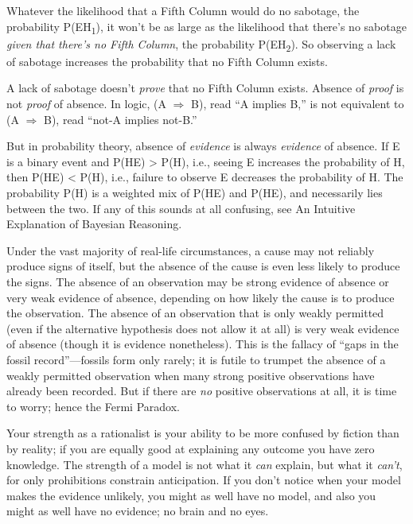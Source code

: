 {
 Whatever the likelihood that a Fifth Column would do no sabotage,
the probability P({\textlnot}E{\textbar}H\textsubscript{1}), it
won't be as large as the likelihood that
there's no sabotage \textit{given that
there's no Fifth Column}, the probability
P({\textlnot}E{\textbar}H\textsubscript{2}). So observing a lack of
sabotage increases the probability that no Fifth Column exists.}

{
 A lack of sabotage doesn't \textit{prove} that no
Fifth Column exists. Absence of \textit{proof} is not \textit{proof} of
absence. In logic, (A $\Rightarrow $ B), read ``A
implies B,'' is not equivalent to ({\textlnot}A
$\Rightarrow $ {\textlnot}B), read ``not-A implies
not-B.''}

{
 But in probability theory, absence of \textit{evidence} is always
\textit{evidence} of absence. If E is a binary event and
P(H{\textbar}E) {\textgreater} P(H), i.e., seeing E increases the
probability of H, then P(H{\textbar}{\textlnot}E) {\textless} P(H),
i.e., failure to observe E decreases the probability of H. The
probability P(H) is a weighted mix of P(H{\textbar}E) and
P(H{\textbar}{\textlnot}E), and necessarily lies between the two. If
any of this sounds at all confusing, see An Intuitive Explanation of
Bayesian Reasoning.}

{
 Under the vast majority of real-life circumstances, a cause may
not reliably produce signs of itself, but the absence of the cause is
even less likely to produce the signs. The absence of an observation
may be strong evidence of absence or very weak evidence of absence,
depending on how likely the cause is to produce the observation. The
absence of an observation that is only weakly permitted (even if the
alternative hypothesis does not allow it at all) is very weak evidence
of absence (though it is evidence nonetheless). This is the fallacy of
``gaps in the fossil
record''---fossils form only rarely; it is futile to
trumpet the absence of a weakly permitted observation when many strong
positive observations have already been recorded. But if there are
\textit{no} positive observations at all, it is time to worry; hence
the Fermi Paradox.}

{
 Your strength as a rationalist is your ability to be more confused
by fiction than by reality; if you are equally good at explaining any
outcome you have zero knowledge. The strength of a model is not what it
\textit{can} explain, but what it \textit{can't}, for
only prohibitions constrain anticipation. If you don't
notice when your model makes the evidence unlikely, you might as well
have no model, and also you might as well have no evidence; no brain
and no eyes.}

